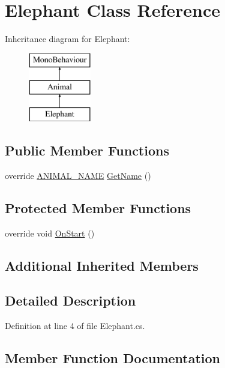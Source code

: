 \hypertarget{class_elephant}{}\section{Elephant Class Reference}
\label{class_elephant}
Inheritance diagram for Elephant\+:\begin{figure}[H]
\begin{center}
\leavevmode
\includegraphics[height=3.000000cm]{class_elephant}
\end{center}
\end{figure}
\subsection*{Public Member Functions}
\begin{DoxyCompactItemize}
\item 
override \mbox{\hyperlink{_animal_8cs_a2fa5713399b84d1b88dae9196837af50}{A\+N\+I\+M\+A\+L\+\_\+\+N\+A\+ME}} \mbox{\hyperlink{class_elephant_a838ab3035927faab686cc180cd305481}{Get\+Name}} ()
\end{DoxyCompactItemize}
\subsection*{Protected Member Functions}
\begin{DoxyCompactItemize}
\item 
override void \mbox{\hyperlink{class_elephant_a4e12b9f8aa13e0ecb5b40c1d68f966aa}{On\+Start}} ()
\end{DoxyCompactItemize}
\subsection*{Additional Inherited Members}


\subsection{Detailed Description}


Definition at line 4 of file Elephant.\+cs.



\subsection{Member Function Documentation}
\mbox{\label{class_elephant_a838ab3035927faab686cc180cd305481}} 
